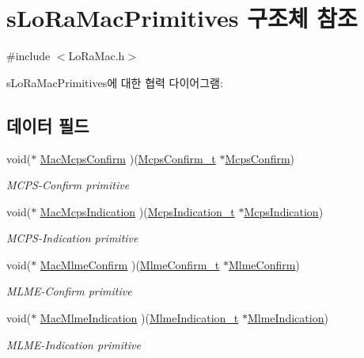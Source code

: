 \hypertarget{structs_lo_ra_mac_primitives}{}\section{s\+Lo\+Ra\+Mac\+Primitives 구조체 참조}
\label{structs_lo_ra_mac_primitives}


{\ttfamily \#include $<$Lo\+Ra\+Mac.\+h$>$}



s\+Lo\+Ra\+Mac\+Primitives에 대한 협력 다이어그램\+:
\subsection*{데이터 필드}
\begin{DoxyCompactItemize}
\item 
void($\ast$ \mbox{\hyperlink{structs_lo_ra_mac_primitives_a2b7cb648bbe609f5fb6fe4e3d0bcda41}{Mac\+Mcps\+Confirm}} )(\mbox{\hyperlink{group___l_o_r_a_m_a_c_ga925536babf8abe83918a19f5ae88bd44}{Mcps\+Confirm\+\_\+t}} $\ast$\mbox{\hyperlink{lora_8c_a7e94673a3e7e54cf2e49675d12189070}{Mcps\+Confirm}})
\begin{DoxyCompactList}\small\item\em M\+C\+P\+S-\/\+Confirm primitive \end{DoxyCompactList}\item 
void($\ast$ \mbox{\hyperlink{structs_lo_ra_mac_primitives_a89cb88517df5ff62828e4cf29454d9e5}{Mac\+Mcps\+Indication}} )(\mbox{\hyperlink{group___l_o_r_a_m_a_c_ga202591b6553d63fae89bd42787496616}{Mcps\+Indication\+\_\+t}} $\ast$\mbox{\hyperlink{lora_8c_aa62f56dcd70e02213fc6e5d0f04b3d1c}{Mcps\+Indication}})
\begin{DoxyCompactList}\small\item\em M\+C\+P\+S-\/\+Indication primitive \end{DoxyCompactList}\item 
void($\ast$ \mbox{\hyperlink{structs_lo_ra_mac_primitives_ade47d176982e0843084c5932445898a2}{Mac\+Mlme\+Confirm}} )(\mbox{\hyperlink{group___l_o_r_a_m_a_c_ga73d9d9e11e282a6c258c4d22865fe824}{Mlme\+Confirm\+\_\+t}} $\ast$\mbox{\hyperlink{lora_8c_ab72b68cc96c6187003c5dd6e325a74c7}{Mlme\+Confirm}})
\begin{DoxyCompactList}\small\item\em M\+L\+M\+E-\/\+Confirm primitive \end{DoxyCompactList}\item 
void($\ast$ \mbox{\hyperlink{structs_lo_ra_mac_primitives_a353881c42ec9e21f3112dd548a3da87a}{Mac\+Mlme\+Indication}} )(\mbox{\hyperlink{group___l_o_r_a_m_a_c_ga3003d863a5b49c5f3371ffa5cabb1a0b}{Mlme\+Indication\+\_\+t}} $\ast$\mbox{\hyperlink{lora_8c_ac778062b2493443f2c69391ad03e22e8}{Mlme\+Indication}})
\begin{DoxyCompactList}\small\item\em M\+L\+M\+E-\/\+Indication primitive \end{DoxyCompactList}\end{DoxyCompactItemize}


